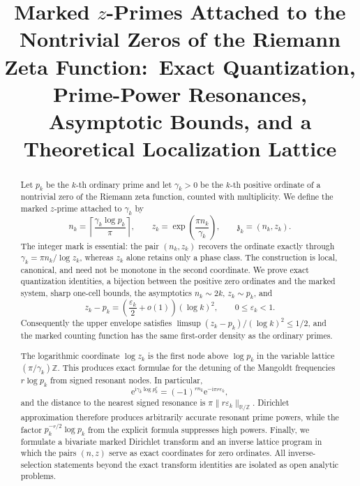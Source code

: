 \documentclass[11pt]{amsart}
\title[Marked $z$-Primes and a Spectral Lattice]{
Marked $z$-Primes Attached to the Nontrivial Zeros of the Riemann Zeta Function:\
Exact Quantization, Prime-Power Resonances, Asymptotic Bounds, and a Theoretical Localization Lattice
}
\author{}
\date{}
\numberwithin{equation}{section}
\theoremstyle{plain}
\theoremstyle{definition}
\theoremstyle{remark}
\newcommand{\e}{\mathrm e}
\newcommand{\ii}{\mathrm i}
\newcommand{\R}{\mathbb R}
\begin{document}
\begin{abstract}
Let $p_k$ be the $k$-th ordinary prime and let $\gamma_k>0$ be the
$k$-th positive ordinate of a nontrivial zero of the Riemann zeta
function, counted with multiplicity.  We define the marked $z$-prime
attached to $\gamma_k$ by
\begin{equation}
 n_k=\left\lceil\frac{\gamma_k\log p_k}{\pi}\right\rceil,
 \qquad
 z_k=\exp\left(\frac{\pi n_k}{\gamma_k}\right),
 \qquad
 \mathfrak z_k=(n_k,z_k).
 \label{eq:abstract_definition}
\end{equation}
The integer mark is essential: the pair $(n_k,z_k)$ recovers the ordinate
exactly through $\gamma_k=\pi n_k/\log z_k$, whereas $z_k$ alone retains
only a phase class.  The construction is local, canonical, and need not be
monotone in the second coordinate.  We prove exact quantization identities,
a bijection between the positive zero ordinates and the marked system,
sharp one-cell bounds, the asymptotics $n_k\sim2k$, $z_k\sim p_k$, and
\begin{equation}
 z_k-p_k
 =\left(\frac{\varepsilon_k}{2}+o(1)\right)(\log k)^2,
 \qquad 0\leq\varepsilon_k<1.
 \label{eq:abstract_displacement}
\end{equation}
Consequently the upper envelope satisfies
$\limsup (z_k-p_k)/(\log k)^2\leq1/2$, and the marked counting function has
the same first-order density as the ordinary primes.

The logarithmic coordinate $\log z_k$ is the first node above $\log p_k$
in the variable lattice $(\pi/\gamma_k)\mathbb Z$.  This produces exact
formulae for the detuning of the Mangoldt frequencies $r\log p_k$ from
signed resonant nodes.  In particular,
\begin{equation}
 \e^{\ii\gamma_k\log p_k^r}
 =(-1)^{rn_k}\e^{-\ii\pi r\varepsilon_k},
 \label{eq:abstract_prime_power_phase}
\end{equation}
and the distance to the nearest signed resonance is
$\pi\|r\varepsilon_k\|_{\R/\mathbb Z}$.  Dirichlet approximation therefore
produces arbitrarily accurate resonant prime powers, while the factor
$p_k^{-r/2}\log p_k$ from the explicit formula suppresses high powers.
Finally, we formulate a bivariate marked Dirichlet transform and an inverse
lattice program in which the pairs $(n,z)$ serve as exact coordinates for
zero ordinates.  All inverse-selection statements beyond the exact transform
identities are isolated as open analytic problems.
\end{abstract}

\maketitle
\tableofcontents
\end{document}
